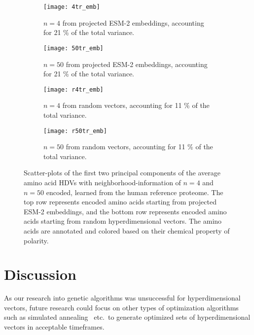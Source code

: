 \begin{figure}[H]
    \centering
    \begin{subfigure}[b]{0.45\textwidth}
        \texttt{[image: 4tr\_emb]}
        \caption{$n = 4$ from projected ESM-2 embeddings, accounting for 21 \% of the total variance.}
        \label{fig:AAtr4}
    \end{subfigure}
    \hfill
    \begin{subfigure}[b]{0.45\textwidth}
        \texttt{[image: 50tr\_emb]}
        \caption{$n = 50$ from projected ESM-2 embeddings, accounting for 21 \% of the total variance.}
        \label{fig:AAtr50}
    \end{subfigure}
    \vspace{10pt} %
    \begin{subfigure}[b]{0.45\textwidth}
        \texttt{[image: r4tr\_emb]}
        \caption{$n = 4$ from random vectors, accounting for 11 \% of the total variance.}
        \label{fig:AArtr4}
    \end{subfigure}
    \hfill
    \begin{subfigure}[b]{0.45\textwidth}
        \texttt{[image: r50tr\_emb]}
        \caption{$n = 50$ from random vectors, accounting for 11 \% of the total variance.}
        \label{fig:AArtr50}
    \end{subfigure}
    \caption{Scatter-plots of the first two principal components of the average amino acid HDVs with neighborhood-information of $n = 4$ and $n = 50$ encoded, learned from the human reference proteome. The top row represents encoded amino acids starting from projected ESM-2 embeddings, and the bottom row represents encoded amino acids starting from random hyperdimensional vectors. The amino acids are annotated and colored based on their chemical property of polarity.}\label{fig:bigfig}
\end{figure}

\section{Discussion}\label{sec:dis3}
As our research into genetic algorithms was unsuccessful for hyperdimensional vectors, future research could focus on other types of optimization algorithms such as simulated annealing~\cite{sa} etc.\ to generate optimized sets of hyperdimensional vectors in acceptable timeframes.

